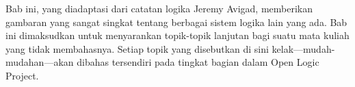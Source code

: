 \documentclass[../../../include/open-logic-chapter]{subfiles}
\begin{document}

\begin{editorial}
  Bab ini, yang diadaptasi dari catatan logika Jeremy Avigad, memberikan
  gambaran yang sangat singkat tentang berbagai sistem logika lain yang ada.
  Bab ini dimaksudkan untuk menyarankan topik-topik lanjutan bagi suatu mata
  kuliah yang tidak membahasnya. Setiap topik yang disebutkan di sini
  kelak---mudah-mudahan---akan dibahas tersendiri pada tingkat bagian dalam
  Open Logic Project.
\end{editorial}








\OLEndChapterHook
\end{document}
